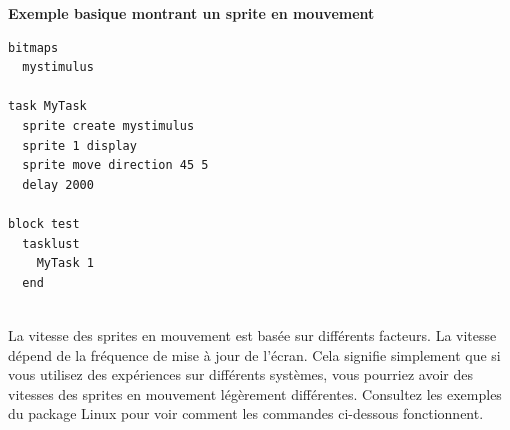 \documentclass[
]{book}
\begin{document}
\textbf{Exemple basique montrant un sprite en mouvement}

\begin{verbatim}
bitmaps
  mystimulus

task MyTask
  sprite create mystimulus
  sprite 1 display
  sprite move direction 45 5
  delay 2000

block test
  tasklust
    MyTask 1
  end
  
\end{verbatim}

La vitesse des sprites en mouvement est basée sur différents facteurs.
La vitesse dépend de la fréquence de mise à jour de l'écran. Cela
signifie simplement que si vous utilisez des expériences sur différents
systèmes, vous pourriez avoir des vitesses des sprites en mouvement
légèrement différentes. Consultez les exemples du package Linux pour
voir comment les commandes ci-dessous fonctionnent.
\end{document}
